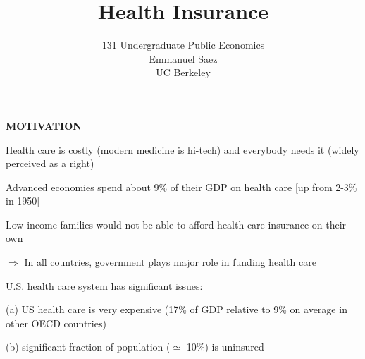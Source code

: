 \documentclass[landscape]{slides}
\author{131 Undergraduate Public Economics \\ Emmanuel Saez \\ UC Berkeley}
\date{}
\title{Health Insurance} \onlyslides{1-300}
\begin{document}
\begin{slide}
\maketitle
\end{slide}


\begin{slide}
\begin{center}
{\bf MOTIVATION}
\end{center}
Health care is costly (modern medicine is hi-tech) and everybody needs it (widely perceived as a right)

Advanced economies spend about 9\% of their GDP on health care [up from 2-3\% in 1950]

Low income families would not be able to afford health care insurance on their own

$\Rightarrow$ In all countries, government plays major role in funding health care

U.S. health care system has significant issues: 

(a) US
health care is very expensive (17\% of GDP relative to 9\% on average in other OECD countries)


(b) significant fraction of population ($\simeq$ 10\%) is uninsured




\end{slide}



\begin{slide}

\end{slide}

\begin{slide}

\end{slide}

\begin{slide}

\end{slide}
\end{document}
